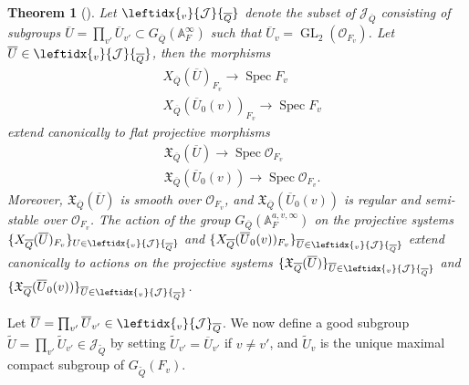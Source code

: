 \documentclass[a4paper, notitlepage, 10pt]{amsart}
\theoremstyle{plain} %
\newtheorem{theorem}{Theorem}[section]
\theoremstyle{definition} %
\theoremstyle{remark} %
\numberwithin{equation}{section}
\newcommand{\GL}{\operatorname{GL}} %
\newcommand{\Spec}{\operatorname{Spec}} %
\begin{document}
\begin{theorem}[{\cite[Theorem 4.3]{Tho16}}]
    Let $\leftidx{_v}{\mathcal{J}}{_{\overline{Q}}}$ denote the subset of $\mathcal{J}_{\overline{Q}}$ consisting of subgroups $\overline{U}=\prod_{v'} \overline{U}_{v'}\subset G_{\overline{Q}}(\mathbb{A}_F^\infty)$ such that $\overline{U}_v=\GL_2(\mathcal{O}_{F_v})$. Let $\overline{U}\in \leftidx{_v}{\mathcal{J}}{_{\overline{Q}}}$, then the morphisms
    \begin{align*}
        &X_{\overline{Q}}(\overline{U})_{F_v}\longrightarrow \Spec F_v
        \\ &X_{\overline{Q}}(\overline{U}_0(v))_{F_v}\longrightarrow \Spec F_v
    \end{align*}
    extend canonically to flat projective morphisms 
       \begin{align*}
        &{\mathfrak{X}_{\overline{Q}}}(\overline{U})\longrightarrow \Spec \mathcal{O}_{F_v}
        \\ &{\mathfrak{X}_{\overline{Q}}}(\overline{U}_0(v))\longrightarrow \Spec \mathcal{O}_{F_v}.
    \end{align*} 
    Moreover, ${\mathfrak{X}}{_{\overline{Q}}}(\overline{U})$ is smooth over $\mathcal{O}_{F_v}$, and ${\mathfrak{X}}{_{\overline{Q}}}(\overline{U}_0(v))$ is regular and semi-stable over $\mathcal{O}_{F_v}$. The action of the group $G_{\overline{Q}}(\mathbb{A}_F^{a,v,\infty})$ on the projective systems $\{X_{\overline{Q}}(\overline{U})_{F_v}\}_{U\in \leftidx{_v}{\mathcal{J}}{_{\overline{Q}}}} $ and $\{X_{\overline{Q}}(\overline{U}_0(v))_{F_v}\}_{\overline{U}\in \leftidx{_v}{\mathcal{J}}{_{\overline{Q}}}} $ extend canonically to actions on the projective systems $\{ {\mathfrak{X}_{\overline{Q}}}(\overline{U})\}_{\overline{U}\in \leftidx{_v}{\mathcal{J}}{_{\overline{Q}}}} $ and $\{{\mathfrak{X}_{\overline{Q}}}(\overline{U}_0(v))\}_{\overline{U}\in \leftidx{_v}{\mathcal{J}}{_{\overline{Q}}}} $.
\end{theorem}
Let $\overline{U}=\prod_{v'} \overline{U}_{v'}\in \leftidx{_{v}}{\mathcal{J}}_{\overline{Q}}$. We now define a good subgroup $\widetilde{U}=\prod_{v'} \widetilde{U}_{v'}\in \mathcal{J}_{\widetilde{Q}}$ by setting $\widetilde{U}_{v'}=\overline{U}_{v'}$ if $v\neq v'$, and $\widetilde{U}_v$ is the unique maximal compact subgroup of $G_{\widetilde{Q}}(F_v)$.
\end{document}
